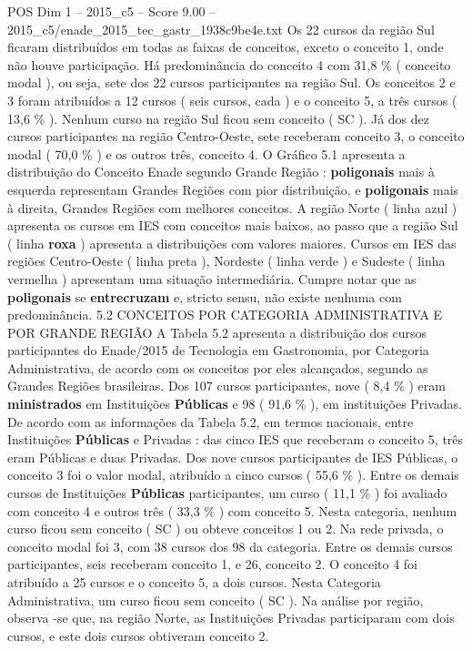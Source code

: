 \begin{textsample}{POS Dim 1 – 2015\_c5 – Score 9.00 – 2015\_c5/enade\_2015\_tec\_gastr\_1938c9be4e.txt}
Os 22 cursos da região Sul ficaram distribuídos em todas as faixas de conceitos, exceto o conceito 1, onde não houve participação.
Há predominância do conceito 4 com 31,8 \% ( conceito modal ), ou seja, sete dos 22 cursos participantes na região Sul.
Os conceitos 2 e 3 foram atribuídos a 12 cursos ( seis cursos, cada ) e o conceito 5, a três cursos ( 13,6 \% ).
Nenhum curso na região Sul ficou sem conceito ( SC ).
Já dos dez cursos participantes na região Centro-Oeste, sete receberam conceito 3, o conceito modal ( 70,0 \% ) e os outros três, conceito 4.
O Gráfico 5.1 apresenta a distribuição do Conceito Enade segundo Grande Região : \textbf{poligonais} mais à esquerda representam Grandes Regiões com pior distribuição, e \textbf{poligonais} mais à direita, Grandes Regiões com melhores conceitos.
A região Norte ( linha azul ) apresenta os cursos em IES com conceitos mais baixos, ao passo que a região Sul ( linha \textbf{roxa} ) apresenta a distribuições com valores maiores.
Cursos em IES das regiões Centro-Oeste ( linha preta ), Nordeste ( linha verde ) e Sudeste ( linha vermelha ) apresentam uma situação intermediária.
Cumpre notar que as \textbf{poligonais} se \textbf{entrecruzam} e, stricto sensu, não existe nenhuma com predominância. 5.2 CONCEITOS POR CATEGORIA ADMINISTRATIVA E POR GRANDE REGIÃO A Tabela 5.2 apresenta a distribuição dos cursos participantes do Enade/2015 de Tecnologia em Gastronomia, por Categoria Administrativa, de acordo com os conceitos por eles alcançados, segundo as Grandes Regiões brasileiras.
Dos 107 cursos participantes, nove ( 8,4 \% ) eram \textbf{ministrados} em Instituições \textbf{Públicas} e 98 ( 91,6 \% ), em instituições Privadas.
De acordo com as informações da Tabela 5.2, em termos nacionais, entre Instituições \textbf{Públicas} e Privadas : das cinco IES que receberam o conceito 5, três eram Públicas e duas Privadas.
Dos nove cursos participantes de IES Públicas, o conceito 3 foi o valor modal, atribuído a cinco cursos ( 55,6 \% ).
Entre os demais cursos de Instituições \textbf{Públicas} participantes, um curso ( 11,1 \% ) foi avaliado com conceito 4 e outros três ( 33,3 \% ) com conceito 5.
Nesta categoria, nenhum curso ficou sem conceito ( SC ) ou obteve conceitos 1 ou 2.
Na rede privada, o conceito modal foi 3, com 38 cursos dos 98 da categoria.
Entre os demais cursos participantes, seis receberam conceito 1, e 26, conceito 2.
O conceito 4 foi atribuído a 25 cursos e o conceito 5, a dois cursos.
Nesta Categoria Administrativa, um curso ficou sem conceito ( SC ).
Na análise por região, observa -se que, na região Norte, as Instituições Privadas participaram com dois cursos, e este dois cursos obtiveram conceito 2.

\end{textsample}
